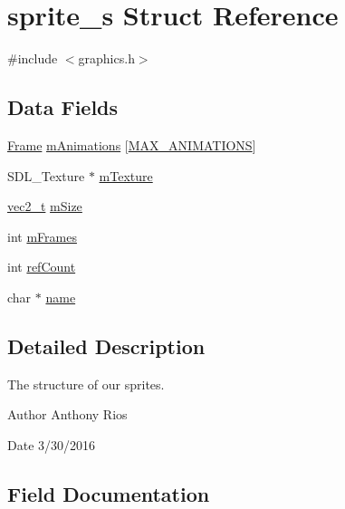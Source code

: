 \hypertarget{structsprite__s}{}\section{sprite\+\_\+s Struct Reference}
\label{structsprite__s}


{\ttfamily \#include $<$graphics.\+h$>$}

\subsection*{Data Fields}
\begin{DoxyCompactItemize}
\item 
\hyperlink{struct_frame}{Frame} \hyperlink{structsprite__s_a8ce6c2916d6244600c434144ed6ac296}{m\+Animations} \mbox{[}\hyperlink{graphics_8h_a99f9cfd68ef4237b568bda6e3e63312f}{M\+A\+X\+\_\+\+A\+N\+I\+M\+A\+T\+I\+O\+NS}\mbox{]}
\item 
S\+D\+L\+\_\+\+Texture $\ast$ \hyperlink{structsprite__s_a13441ecc6f09930e330ecc4b48189778}{m\+Texture}
\item 
\hyperlink{globals_8h_a773f2054819bb6014f1e50baa39cb5e3}{vec2\+\_\+t} \hyperlink{structsprite__s_a94c822928b0483a24e1f4a176f161954}{m\+Size}
\item 
int \hyperlink{structsprite__s_acd9c3d76b8dfc0aed0c331ec5f0568f1}{m\+Frames}
\item 
int \hyperlink{structsprite__s_a43ab0d8eafd71383b2233bdee65911de}{ref\+Count}
\item 
char $\ast$ \hyperlink{structsprite__s_a5ac083a645d964373f022d03df4849c8}{name}
\end{DoxyCompactItemize}


\subsection{Detailed Description}
The structure of our sprites.

\begin{DoxyAuthor}{Author}
Anthony Rios 
\end{DoxyAuthor}
\begin{DoxyDate}{Date}
3/30/2016 
\end{DoxyDate}


\subsection{Field Documentation}
